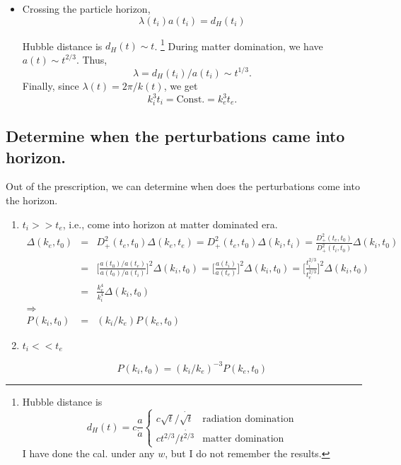 \documentclass{article}
\begin{document}
\begin{itemize}
\item
Crossing the particle horizon,
\begin{equation}
\lambda(t_i)a(t_i)=d_H(t_i)
\end{equation}

Hubble distance is $d_H(t)\sim t$.
\footnote{
Hubble distance is
\begin{equation}
d_H(t)=c\frac{a}{\dot a}
\begin{cases}
c\sqrt{t}/\dot{\sqrt{t}}  & \text{radiation domination} \\
c t^{2/3}/\dot{t^{2/3}} & \text{matter domination}
\end{cases}
\end{equation}
I have done the cal. under any $w$, but I do not remember the results.
} 
During matter domination, we have $a(t)\sim t^{2/3}$.  Thus, \begin{equation}\lambda=d_H(t_i)/a(t_i)\sim t^{1/3}.\end{equation}
Finally, since $\lambda(t)=2\pi /k(t)$, we get
\begin{equation}
k_i^3t_i=\text{Const.}=k_e^3t_e .
\end{equation}


\end{itemize}

\subsection{Determine when the perturbations came into horizon.}
Out of the prescription, we can determine when does the perturbations come into the horizon.

\begin{enumerate}
\item
$t_i>>t_e$, i.e., come into horizon at matter dominated era.
\begin{eqnarray}
\Delta(k_e,t_0)&=&D_+^2(t_e,t_0)\Delta(k_e,t_e)=D_+^2(t_e,t_0)\Delta(k_i,t_i)=\frac{D_+^2(t_e,t_0)}{D_+^2(t_i,t_0)}\Delta(k_i,t_0) \\
&=&\bigg[\frac{a(t_0)/a(t_e)}{a(t_0)/a(t_i)}\bigg]^2\Delta(k_i,t_0)=\bigg[ \frac{a(t_i)}{a(t_e)} \bigg]^2\Delta(k_i,t_0)=\bigg[ \frac{t_i^{2/3}}{t_e^{2/3}} \bigg]^2\Delta(k_i,t_0) \\
&=&\frac{k_e^4}{k_i^4}\Delta(k_i,t_0) \\
\Rightarrow  \nonumber \\ 
P(k_i,t_0)&=&(k_i/k_e)P(k_e,t_0)
\end{eqnarray}



\item
$t_i<<t_e$

\begin{equation}
P(k_i,t_0)=(k_i/k_e)^{-3}P(k_e,t_0)
\end{equation}

\end{enumerate}
\end{document}
